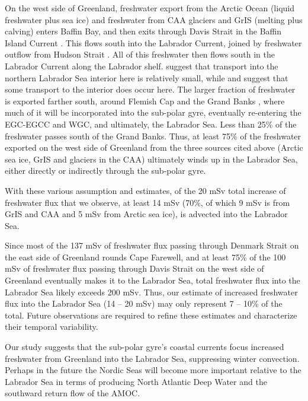 On the west side of Greenland, freshwater export from the Arctic Ocean (liquid freshwater plus sea ice) and freshwater from CAA glaciers and GrIS (melting plus calving) enters Baffin Bay, and then exits through Davis Strait in the Baffin Island Current \cite[]{haine2015arctic,curry2011volume,curry2014multiyear}.  This flows south into the Labrador Current, joined by freshwater outflow from Hudson Strait \cite[]{straneo2008outflow,st2011fate}.  All of this freshwater then flows south in the Labrador Current along the Labrador shelf.  \citet{myers2005impact} suggest that transport into the northern Labrador Sea interior here is relatively small, while \citet{schmidt2007origin} and \citet{mcgeehan2011impact} suggest that some transport to the interior does occur here.  The larger fraction of freshwater is exported farther south, around Flemish Cap and the Grand Banks \cite[]{loder1998coastal,fratantoni2007western,fratantoni2010freshwater}, where much of it will be incorporated into the sub-polar gyre, eventually re-entering the EGC-EGCC and WGC, and ultimately, the Labrador Sea.  Less than 25\% of the freshwater passes south of the Grand Banks.  Thus, at least 75\% of the freshwater exported on the west side of Greenland from the three sources cited above (Arctic sea ice, GrIS and glaciers in the CAA) ultimately winds up in the Labrador Sea, either directly or indirectly through the sub-polar gyre. 
 
With these various assumption and estimates, of the 20 mSv total increase of freshwater flux that we observe, at least 14 mSv (70\%, of which 9 mSv is from GrIS and CAA and 5 mSv from Arctic sea ice), is advected into the Labrador Sea. 
  
Since most of the 137 mSv of freshwater flux passing through Denmark Strait \cite[]{vaage2013revised} on the east side of Greenland rounds Cape Farewell, and at least 75\% of the 100 mSv of freshwater flux passing through Davis Strait \cite[]{haine2015arctic} on the west side of Greenland eventually makes it to the Labrador Sea,  total freshwater flux into the Labrador Sea likely exceeds 200 mSv.  Thus, our estimate of increased freshwater flux into the Labrador Sea (14 – 20 mSv) may only represent 7 – 10\% of the total.  Future observations are required to refine these estimates and characterize their temporal variability. 

Our study suggests that the sub-polar gyre’s coastal currents focus increased freshwater from Greenland into the Labrador Sea, suppressing winter convection.  Perhaps in the future the Nordic Seas will become more important relative to the Labrador Sea in terms of producing North Atlantic Deep Water and the southward return flow of the AMOC.

